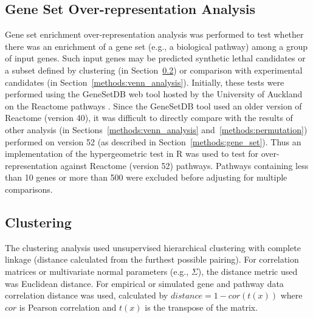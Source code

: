 \subsection{Gene Set Over-representation Analysis} \label{methods:enrichment}
Gene set enrichment over-representation analysis was performed to test whether there was an enrichment of a gene set (e.g., a biological \gls{pathway}) among a group of input genes. Such input genes may be predicted \gls{synthetic lethal} candidates or a subset defined by clustering (in Section~\ref{methods:clustering}) or comparison with experimental candidates (in Section~\ref{methods:venn_analysis}). Initially, these tests were performed using the GeneSetDB web tool \citep{genesetdb} hosted by the University of Auckland on the Reactome \glspl{pathway} \citep{Reactome}. Since the GeneSetDB tool used an older version of Reactome (version 40), it was difficult to directly compare with the results of other analysis (in Sections~\ref{methods:venn_analysis} and~\ref{methods:permutation}) performed on version 52 (as described in  Section~\ref{methods:gene_set}). Thus an implementation of the hypergeometric test in R \citep{R_core} was used to test for over-representation against Reactome (version 52) \glspl{pathway}. Pathways containing less than 10 genes or more than 500 \citep[as performed in GeneSetDB by][]{genesetdb} were excluded before adjusting for multiple comparisons.

\subsection{Clustering} \label{methods:clustering}
The clustering analysis used unsupervised hierarchical clustering with complete linkage (distance calculated from the furthest possible pairing). For correlation matrices or multivariate normal parameters (e.g., $\Sigma$), the distance metric used was Euclidean distance. For empirical or simulated gene and \gls{pathway}  data correlation distance was used, calculated by $distance = 1 - cor(t(x))$ where $cor$ is Pearson correlation and $t(x)$ is the transpose of the  matrix. 

